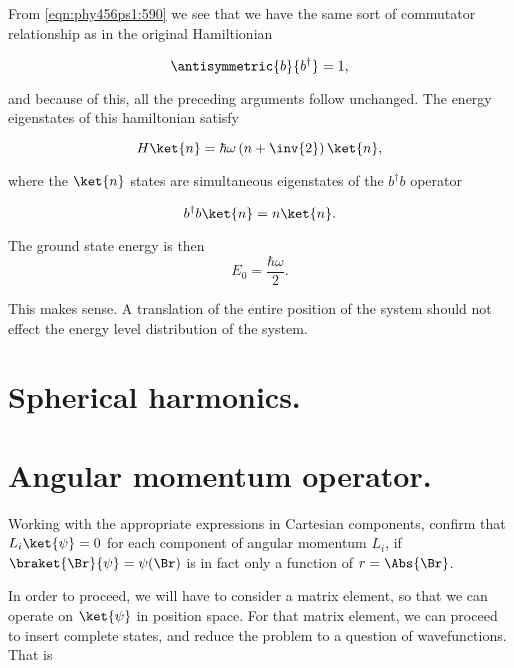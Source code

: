 From \ref{eqn:phy456ps1:590} we see that we have the same sort of commutator relationship as in the original Hamiltionian

\begin{equation}\label{eqn:phy456ps1:610}
\antisymmetric{b}{b^\dagger} = 1,
\end{equation}

and because of this, all the preceding arguments follow unchanged.  The energy eigenstates of this hamiltonian satisfy

\begin{equation}\label{eqn:phy456ps1:620}
H \ket{n} = \hbar \omega \left( n + \inv{2} \right) \ket{n},
\end{equation}

where the $\ket{n}$ states are simultaneous eigenstates of the $b^\dagger b$ operator

\begin{equation}\label{eqn:phy456ps1:630}
b^\dagger b \ket{n} = n \ket{n}.
\end{equation}

The ground state energy is then
\begin{equation}\label{eqn:phy456ps1:640}
E_0 = \frac{\hbar \omega }{2}.
\end{equation}

This makes sense.  A translation of the entire position of the system should not effect the energy level distribution of the system.

\section{Spherical harmonics.}

\section{Angular momentum operator.}

Working with the appropriate expressions in Cartesian components, confirm that $L_i \ket{\psi} = 0$ for each component of angular momentum $L_i$, if $\braket{\Br}{\psi} = \psi(\Br)$ is in fact only a function of $r = \Abs{\Br}$.

In order to proceed, we will have to consider a matrix element, so that we can operate on $\ket{\psi}$ in position space.  For that matrix element, we can proceed to insert complete states, and reduce the problem to a question of wavefunctions.  That is

